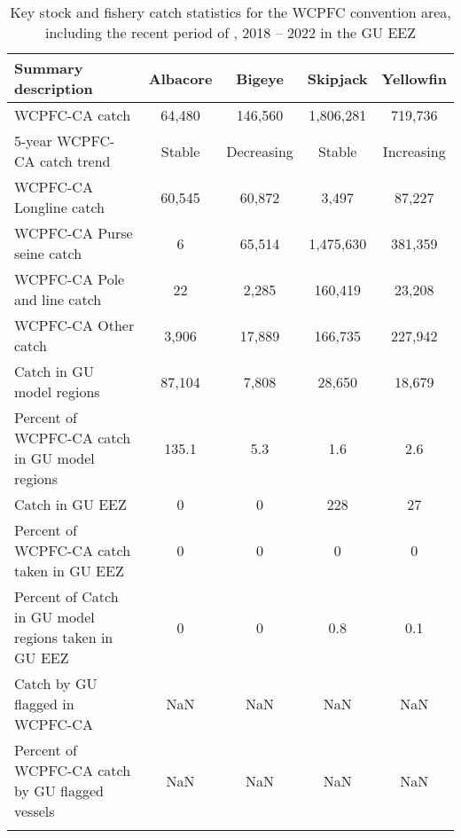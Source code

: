 \begin{longtable}{lcccc}
\caption{Key stock and fishery catch statistics for the WCPFC convention area, including the recent period of , 2018 -- 2022 in the GU EEZ} \\ 
  \hline
Summary description & Albacore & Bigeye & Skipjack & Yellowfin \\ 
  \hline
WCPFC-CA catch & 64,480 & 146,560 & 1,806,281 & 719,736 \\ 
  5-year WCPFC-CA catch trend & Stable & Decreasing & Stable & Increasing \\ 
  WCPFC-CA Longline catch & 60,545 & 60,872 & 3,497 & 87,227 \\ 
  WCPFC-CA Purse seine catch & 6 & 65,514 & 1,475,630 & 381,359 \\ 
  WCPFC-CA Pole and line catch & 22 & 2,285 & 160,419 & 23,208 \\ 
  WCPFC-CA Other catch & 3,906 & 17,889 & 166,735 & 227,942 \\ 
  Catch in GU model regions & 87,104 & 7,808 & 28,650 & 18,679 \\ 
  Percent of WCPFC-CA catch in GU model regions & 135.1 & 5.3 & 1.6 & 2.6 \\ 
   \hline
Catch in GU EEZ & 0 & 0 & 228 & 27 \\ 
  Percent of WCPFC-CA catch taken in GU EEZ & 0 & 0 & 0 & 0 \\ 
  Percent of Catch in GU model regions taken in GU EEZ & 0 & 0 & 0.8 & 0.1 \\ 
  Catch by GU flagged in WCPFC-CA & NaN & NaN & NaN & NaN \\ 
  Percent of WCPFC-CA catch by GU flagged vessels & NaN & NaN & NaN & NaN \\ 
  \hline
\label{cat_sum_tab}
\end{longtable}
